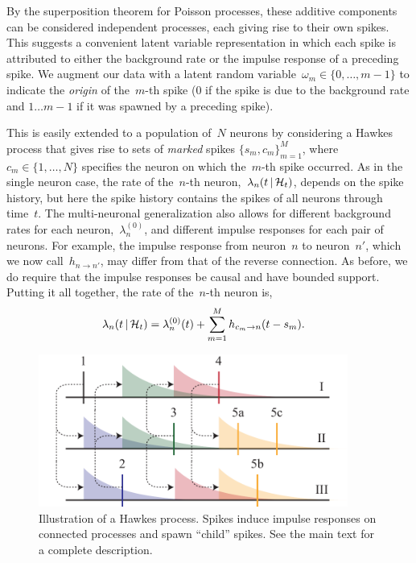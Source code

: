 By the superposition theorem for Poisson processes, these additive
components can be considered independent processes, each giving rise
to their own spikes.  This suggests a convenient latent variable
representation in which each spike is attributed to either the
background rate or the impulse response of a preceding spike.  We
augment our data with a latent random
variable~${\omega_m \in\{0,\ldots, m-1\}}$ to indicate the \emph{origin} of
the~$m$-th spike ($0$ if the spike is due to the background rate and
${1\ldots m-1}$ if it was spawned by a preceding spike). 

This is easily extended to a population of~$N$ neurons by considering a Hawkes
process that gives rise to sets of
\emph{marked} spikes $\{s_m,c_m\}_{m=1}^M$,
where~${c_m\in\{1,\ldots,N\}}$ specifies the neuron on which
the~$m$-th spike occurred.  As in the single neuron case, 
the rate of the~$n$-th neuron,~${\lambda_n(t\,|\,
  \mathcal{H}_t)}$,  depends on the spike history, but here the spike history 
contains the spikes of all neurons through time~$t$. 
The multi-neuronal generalization also allows for different background rates 
for each neuron,~$\lambda^{(0)}_{n}$, and  different impulse 
responses for each pair of neurons. For example, the impulse 
response from neuron~$n$ to neuron~$n'$, which we now call~$h_{n \to n'}$, 
may differ from that of the reverse connection. As before, we
do require that the impulse responses be causal and have bounded support.
Putting it all together, the rate of the~$n$-th neuron is,
\begin{align}
  \label{eq:hawkes_rate}
  \lambda_n(t \,|\, \mathcal{H}_t)
  &= \lambda^{(0)}_{n}(t) + \sum_{m=1}^M h_{c_m \to n}(t - s_m).
\end{align}

\begin{figure}[t]
\centering%
\includegraphics[width=4in]{figures/ch3/Hawkes-wide} 
\vspace{-0.25cm}
\caption[Illustration of a Hawkes process]{Illustration of a Hawkes
  process. Spikes induce impulse responses on connected processes and
  spawn ``child'' spikes. See the main text for a complete
  description.}
\label{fig:hawkes}
\end{figure}

